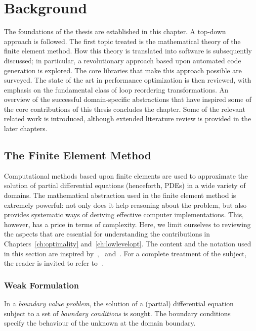 \chapter{Background}
\label{ch:background}

The foundations of the thesis are established in this chapter. A top-down approach is followed. The first topic treated is the mathematical theory of the finite element method. How this theory is translated into software is subsequently discussed; in particular, a revolutionary approach based upon automated code generation is explored. The core libraries that make this approach possible are surveyed. The state of the art in performance optimization is then reviewed, with emphasis on the fundamental class of loop reordering transformations. An overview of the successful domain-specific abstractions that have inspired some of the core contributions of this thesis concludes the chapter. Some of the relevant related work is introduced, although extended literature review is provided in the later chapters.


\section{The Finite Element Method}
\label{sec:bkg:fem}
Computational methods based upon finite elements are used to approximate the solution of partial differential equations (henceforth, PDEs) in a wide variety of domains. The mathematical abstraction used in the finite element method is extremely powerful: not only does it help reasoning about the problem, but also provides systematic ways of deriving effective computer implementations. This, however, has a price in terms of complexity. Here, we limit ourselves to reviewing the aspects that are essential for understanding the contributions in Chapters~\ref{ch:optimality} and~\ref{ch:lowlevelopt}. The content and the notation used in this section are inspired by~\cite{florian-thesis},~\cite{Fenics} and~\cite{quadrature-olegaard}. For a complete treatment of the subject, the reader is invited to refer to~\cite{brenner-and-scott}.



\subsection{Weak Formulation}
\label{sec:bkg:var-problems}
In a {\em boundary value problem}, the solution of a (partial) differential equation subject to a set of {\em boundary conditions} is sought. The boundary conditions specify the behaviour of the unknown at the domain boundary. 

